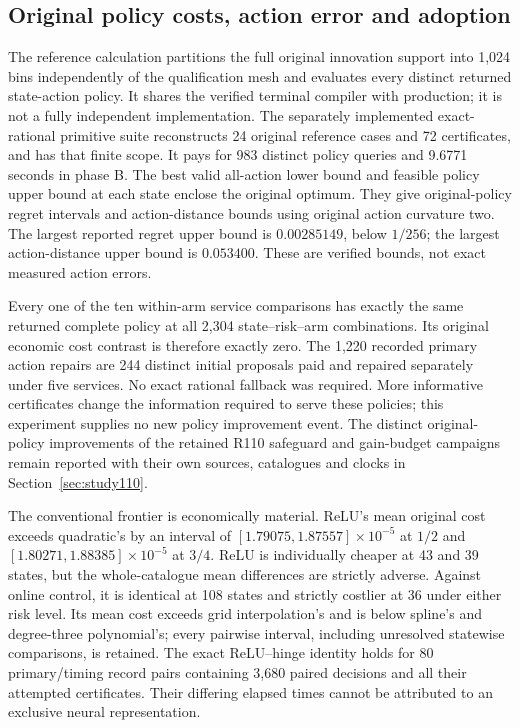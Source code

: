 \subsection{Original policy costs, action error and adoption}
The reference calculation partitions the full original innovation support
into 1,024 bins independently of the qualification mesh and evaluates every
distinct returned state-action policy. It shares the verified terminal
compiler with production; it is not a fully independent implementation.
The separately implemented exact-rational primitive suite reconstructs
24 original reference cases and 72 certificates, and has that finite scope.  It pays for 983 distinct policy queries and 9.6771
seconds in phase B.  The best valid all-action lower bound and feasible
policy upper bound at each state enclose the original optimum.  They
give original-policy regret intervals and action-distance bounds using
original action curvature two.  The largest reported regret upper bound
is $0.00285149$, below $1/256$; the largest action-distance upper bound is
$0.053400$.  These are verified bounds, not exact measured action errors.

Every one of the ten within-arm service comparisons has exactly the same
returned complete policy at all 2,304 state--risk--arm combinations.  Its
original economic cost contrast is therefore exactly zero.  The 1,220
recorded primary action repairs are 244 distinct initial proposals paid
and repaired separately under five services.  No exact rational fallback
was required.  More informative certificates change the information
required to serve these policies; this experiment supplies no new policy
improvement event.  The distinct original-policy improvements of the
retained R110 safeguard and gain-budget campaigns remain reported with
their own sources, catalogues and clocks in Section~\ref{sec:study110}.



The conventional frontier is economically material.  ReLU's mean original
cost exceeds quadratic's by an interval of
$[1.79075,1.87557]\times10^{-5}$ at $1/2$ and
$[1.80271,1.88385]\times10^{-5}$ at $3/4$.
ReLU is individually cheaper at 43 and 39 states, but the whole-catalogue
mean differences are strictly adverse.  Against online control, it is
identical at 108 states and strictly costlier at 36 under either risk
level.  Its mean cost exceeds grid interpolation's and is below spline's
and degree-three polynomial's; every pairwise interval, including
unresolved statewise comparisons, is retained.  The exact ReLU--hinge
identity holds for 80 primary/timing record pairs containing 3,680 paired
decisions and all their attempted certificates.  Their differing elapsed
times cannot be attributed to an exclusive neural representation.

